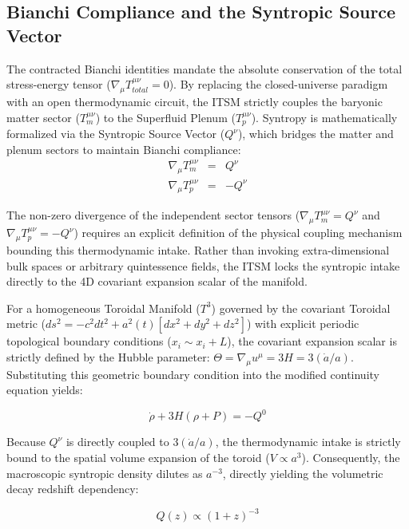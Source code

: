 \documentclass[aps,prd,10pt,twocolumn,superscriptaddress,nofootinbib,floatfix]{revtex4-2}
\begin{document}
\subsection{Bianchi Compliance and the Syntropic Source Vector}
The contracted Bianchi identities mandate the absolute conservation of the total stress-energy tensor ($\nabla_\mu T_{total}^{\mu\nu} = 0$). By replacing the closed-universe paradigm with an open thermodynamic circuit, the ITSM strictly couples the baryonic matter sector ($T_m^{\mu\nu}$) to the Superfluid Plenum ($T_p^{\mu\nu}$). Syntropy is mathematically formalized via the Syntropic Source Vector ($Q^\nu$), which bridges the matter and plenum sectors to maintain Bianchi compliance:
\begin{eqnarray}
\nabla_\mu T_m^{\mu\nu} &=& Q^\nu \\
\nabla_\mu T_p^{\mu\nu} &=& -Q^\nu
\end{eqnarray}

The non-zero divergence of the independent sector tensors ($\nabla_{\mu}T_{m}^{\mu\nu} = Q^{\nu}$ and $\nabla_{\mu}T_{p}^{\mu\nu} = -Q^{\nu}$) requires an explicit definition of the physical coupling mechanism bounding this thermodynamic intake. Rather than invoking extra-dimensional bulk spaces or arbitrary quintessence fields, the ITSM locks the syntropic intake directly to the 4D covariant expansion scalar of the manifold. 

For a homogeneous Toroidal Manifold ($T^3$) governed by the covariant Toroidal metric ($ds^2 = -c^2dt^2 + a^2(t)[dx^2 + dy^2 + dz^2]$) with explicit periodic topological boundary conditions ($x_i \sim x_i + L$), the covariant expansion scalar is strictly defined by the Hubble parameter: $\Theta = \nabla_\mu u^\mu = 3H = 3(\dot{a}/a)$. Substituting this geometric boundary condition into the modified continuity equation yields:

\begin{equation}
\dot{\rho} + 3H(\rho + P) = -Q^0
\end{equation}

Because $Q^\nu$ is directly coupled to $3(\dot{a}/a)$, the thermodynamic intake is strictly bound to the spatial volume expansion of the toroid ($V \propto a^3$). Consequently, the macroscopic syntropic density dilutes as $a^{-3}$, directly yielding the volumetric decay redshift dependency:

\begin{equation} \label{eq:syntropic_decay}
Q(z) \propto (1+z)^{-3}
\end{equation}
\end{document}
